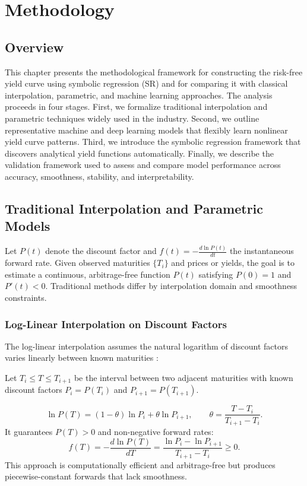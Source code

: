 \documentclass[12pt]{report}
\begin{document}
\chapter{Methodology}

\section{Overview}

This chapter presents the methodological framework for constructing the risk-free yield curve using symbolic regression (SR) and for comparing it with classical interpolation, parametric, and machine learning approaches.  
The analysis proceeds in four stages.  
First, we formalize traditional interpolation and parametric techniques widely used in the industry.  
Second, we outline representative machine and deep learning models that flexibly learn nonlinear yield curve patterns.  
Third, we introduce the symbolic regression framework that discovers analytical yield functions automatically.  
Finally, we describe the validation framework used to assess and compare model performance across accuracy, smoothness, stability, and interpretability.

\section{Traditional Interpolation and Parametric Models}

Let \( P(t) \) denote the discount factor and \( f(t) = -\frac{d\ln P(t)}{dt} \) the instantaneous forward rate.  
Given observed maturities \( \{T_i\} \) and prices or yields, the goal is to estimate a continuous, arbitrage-free function \( P(t) \) satisfying \( P(0)=1 \) and \( P'(t)<0 \).  
Traditional methods differ by interpolation domain and smoothness constraints.

\subsection{Log-Linear Interpolation on Discount Factors}

The log-linear interpolation assumes the natural logarithm of discount factors varies linearly between known maturities \parencite{BrigoMercurio2006,HaganWest2006}:

Let \( T_i \le T \le T_{i+1} \) be the interval between two adjacent maturities with known discount factors \( P_i = P(T_i) \) and \( P_{i+1} = P(T_{i+1}) \). 

\[
\ln P(T) = (1-\theta)\ln P_i + \theta \ln P_{i+1}, 
\qquad \theta = \frac{T-T_i}{T_{i+1}-T_i}.
\]
It guarantees \(P(T)>0\) and non-negative forward rates:
\[
f(T) = -\frac{d \ln P(T)}{dT} 
       = \frac{\ln P_i - \ln P_{i+1}}{T_{i+1}-T_i} \ge 0.
\]
This approach is computationally efficient and arbitrage-free but produces piecewise-constant forwards that lack smoothness.
\end{document}
